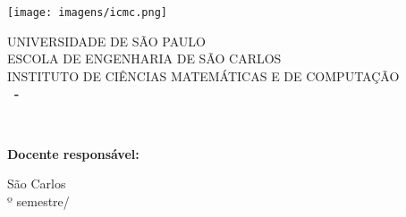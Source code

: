 \begin{titlepage}
    \begin{center}
        \vspace*{0.5cm}
        \texttt{[image: imagens/icmc.png]}
            
        \Large
        UNIVERSIDADE DE SÃO PAULO\\
        ESCOLA DE ENGENHARIA DE SÃO CARLOS\\
        INSTITUTO DE CIÊNCIAS MATEMÁTICAS E DE COMPUTAÇÃO\\
        
        \vspace{2cm}
        \LARGE
        \textbf{
            \imprimirMateria \ - \imprimirCodMateria
        }
        
        \vspace{3.5cm}
        \Huge
        \uppercase{\textbf{\ 
            \imprimirTitulo\\
            }
        }
        \LARGE
        \ifnotempty{\imprimirSubtitulo}{~\imprimirSubtitulo}\par%
        
        \vfill
        \large
        \imprimirAutores
        
        \vspace{1.5cm}
        \textbf{Docente responsável:} \imprimirDocente
        
        \vspace{1cm}
        \Large
        São Carlos\\
        \imprimirSemestre º semestre/\imprimirAno
            
    \end{center}
\end{titlepage}